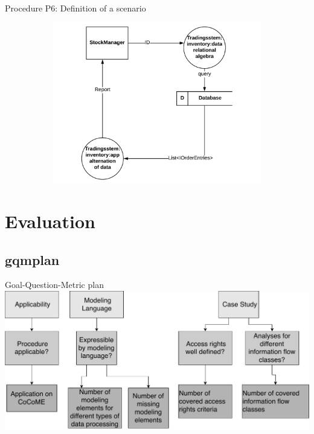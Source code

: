 \documentclass[18pt]{beamer}
\begin{document}
\begin{frame}{Procedure P6: Definition of a scenario}
\begin{figure}
\begin{subfigure}{.4\textwidth}
\end{subfigure}%
\begin{subfigure}{.6\textwidth}
\includegraphics[scale=.25]{logos/DFUC13_Presentation.pdf}
\end{subfigure}
\end{figure}
\end{frame}

\section{Evaluation}
\subsection{gqmplan}
\begin{frame}{Goal-Question-Metric plan}
\includegraphics[scale=0.45]{logos/OverviewEvalPresShort.pdf}

\end{frame}
\end{document}
